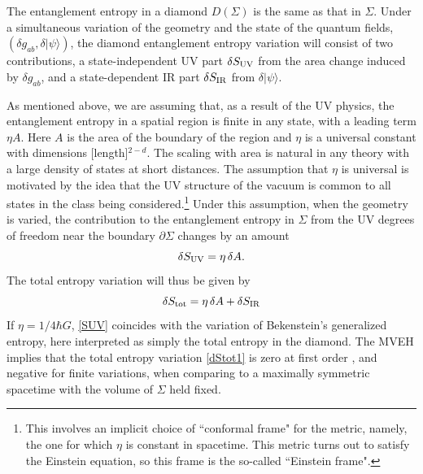 \documentclass[aps,prd,twocolumn,showpacs,groupedaddress,nofootinbib,longbibliography]{revtex4-1}
\def\beq{\begin{equation}}
\def\eeq{\end{equation}}
\def\ra{\rangle}
\def\d{\delta}\def\D{\Delta}
\def\l{\lambda}
\def\S{\Sigma }
\def\vphi{\varphi}
\begin{document}

The entanglement entropy in a diamond $D(\Sigma)$ is the same as that in $\Sigma$.
Under a simultaneous variation of the geometry and the state of the quantum fields,
$(\d g_{ab}, \d|\psi\ra)$, the diamond entanglement entropy variation will consist of two 
contributions, a state-independent UV part 
$\d S_{\rm UV}$ from the area change induced by $\d g_{ab}$, and a state-dependent 
IR part $\d S_{\rm IR}$ from $\d|\psi\ra$. 

As mentioned above, we are assuming that, as a result of the UV physics, the entanglement entropy in a spatial
region is finite in any state, with a leading term $\eta A$. Here $A$ is the area of the boundary of the region and 
$\eta$ is a universal constant with dimensions [length]${}^{2-d}$.
The scaling with area is natural in any theory with a large density of states at short distances. The assumption that $\eta$ is universal is motivated by the idea that the UV structure of the vacuum is common to all states in the class being considered.\footnote{This involves an implicit choice of ``conformal frame" \cite{Flanagan:2004bz} for the metric, namely, the one for which $\eta$ is constant in spacetime. This metric turns out to satisfy the Einstein equation, so this frame is the so-called ``Einstein frame".}
Under this assumption, when the geometry is varied, the contribution to the entanglement entropy in 
$\S$ from the UV degrees of freedom near the boundary  $\partial\Sigma$
changes by an amount
%
\beq\label{SUV}
\d S_{\rm UV}=\eta\, \d A. 
\eeq
%
The total entropy variation will thus be given by 
%
\beq\label{dStot1}
\d S_{\rm tot} = \eta\, \d A + \d S_{\rm IR}
\eeq
%
If $\eta=1/4\hbar G$, \eqref{SUV} coincides with 
the variation of Bekenstein's generalized entropy, here interpreted as simply the total entropy in the diamond.
The MVEH implies that the total entropy variation \eqref{dStot1} is zero at first order , and negative for finite 
variations, when comparing to a maximally symmetric spacetime with 
the volume of $\S$ held fixed. 
\end{document}
